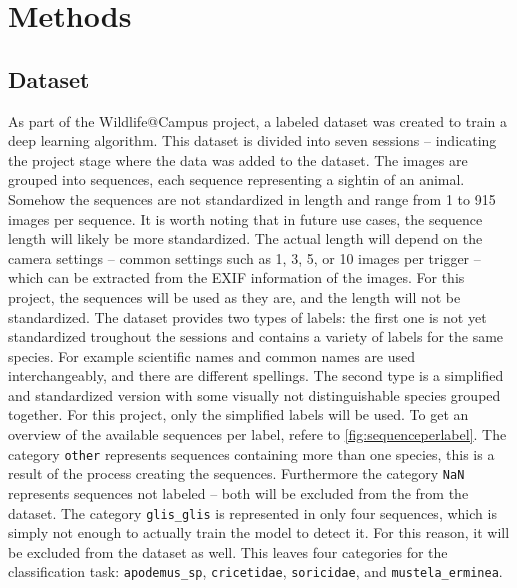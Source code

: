

\section{Methods}
\label{methods}

    \subsection{Dataset}

    As part of the Wildlife@Campus project, a labeled dataset was created to train a deep learning algorithm.
    This dataset is divided into seven sessions -- indicating the project stage where the data was added to the dataset.
    The images are grouped into sequences, each sequence representing a sightin of an animal.
    Somehow the sequences are not standardized in length and range from 1 to 915 images per sequence.
    It is worth noting that in future use cases, the sequence length will likely be more standardized.
    The actual length will depend on the camera settings -- common settings such as 1, 3, 5, or 10 images per trigger -- which can be extracted from the EXIF information of the images.
    For this project, the sequences will be used as they are, and the length will not be standardized.
    The dataset provides two types of labels: the first one is not yet standardized troughout the sessions and contains a variety of labels for the same species.
    For example scientific names and common names are used interchangeably, and there are different spellings.
    The second type is a simplified and standardized version with some visually not distinguishable species grouped together.
    For this project, only the simplified labels will be used.
    To get an overview of the available sequences per label, refere to \autoref{fig:sequenceperlabel}.
    The category \texttt{other} represents sequences containing more than one species, this is a result of the process creating the sequences.
    Furthermore the category \texttt{NaN} represents sequences not labeled -- both will be excluded from the from the dataset.
    The category \texttt{glis\_glis} is represented in only four sequences, which is simply not enough to actually train the model to detect it.
    For this reason, it will be excluded from the dataset as well.
    This leaves four categories for the classification task: \texttt{apodemus\_sp}, \texttt{cricetidae}, \texttt{soricidae}, and \texttt{mustela\_erminea}.

